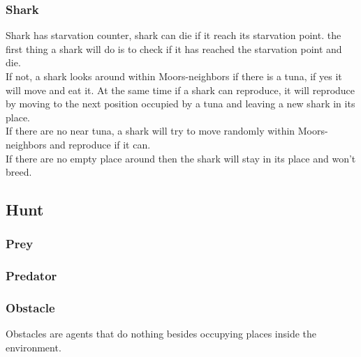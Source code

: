 \subsubsection{Shark}
Shark has starvation counter, shark can die if it reach its starvation point. the first thing a shark will do is to check if it has reached the starvation point and die.\\
If not, a shark looks around within Moors-neighbors if there is a tuna, if yes it will move and eat it. At the same time if a shark can reproduce, it will reproduce by moving to the next position occupied by a tuna and leaving a new shark in its place.\\
If there are no near tuna, a shark will try to move randomly within Moors-neighbors and reproduce if it can.\\
If there are no empty place around then the shark will stay in its place and won't breed.

\subsection{Hunt}
\subsubsection{Prey}

\subsubsection{Predator}

\subsubsection{Obstacle}
Obstacles are agents that do nothing besides occupying places inside the environment.

